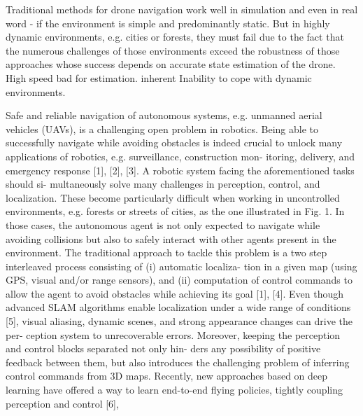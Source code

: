 Traditional methods for drone navigation work well in simulation
and even in real word - if the environment is simple and predominantly static.
But in highly dynamic environments, e.g. cities or forests,
they must fail due to the fact that the numerous challenges of those 
environments exceed the robustness of those approaches
whose success depends on accurate state estimation of the drone.
High speed bad for estimation. inherent
Inability to cope with dynamic environments.







Safe and reliable navigation of autonomous systems, e.g.
unmanned aerial vehicles (UAVs), is a challenging open
problem in robotics. Being able to successfully navigate
while avoiding obstacles is indeed crucial to unlock many
applications of robotics, e.g. surveillance, construction mon-
itoring, delivery, and emergency response [1], [2], [3]. A
robotic system facing the aforementioned tasks should si-
multaneously solve many challenges in perception, control,
and localization. These become particularly difficult when
working in uncontrolled environments, e.g. forests or streets
of cities, as the one illustrated in Fig. 1. In those cases, the
autonomous agent is not only expected to navigate while
avoiding collisions but also to safely interact with other
agents present in the environment.
The traditional approach to tackle this problem is a two
step interleaved process consisting of (i) automatic localiza-
tion in a given map (using GPS, visual and/or range sensors),
and (ii) computation of control commands to allow the agent
to avoid obstacles while achieving its goal [1], [4]. Even
though advanced SLAM algorithms enable localization under
a wide range of conditions [5], visual aliasing, dynamic
scenes, and strong appearance changes can drive the per-
ception system to unrecoverable errors. Moreover, keeping
the perception and control blocks separated not only hin-
ders any possibility of positive feedback between them, but
also introduces the challenging problem of inferring control
commands from 3D maps. Recently, new approaches based
on deep learning have offered a way to learn end-to-end
flying policies, tightly coupling perception and control [6],

















